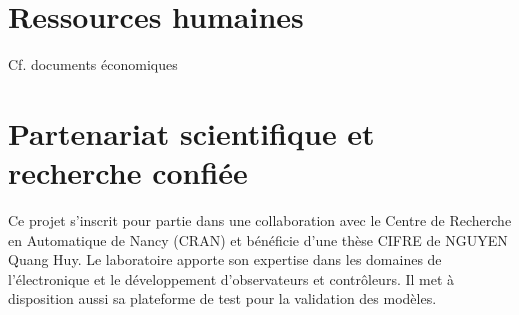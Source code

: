 \section{Ressources humaines}

Cf. documents économiques 

\section{Partenariat scientifique et recherche confiée}

Ce projet s’inscrit pour partie dans une collaboration avec le Centre de Recherche en Automatique de Nancy (CRAN) et bénéficie d’une thèse CIFRE de NGUYEN Quang Huy. Le laboratoire apporte son expertise dans les domaines de l’électronique et le développement d’observateurs et contrôleurs. Il met à disposition aussi sa plateforme de test pour la validation des modèles.


